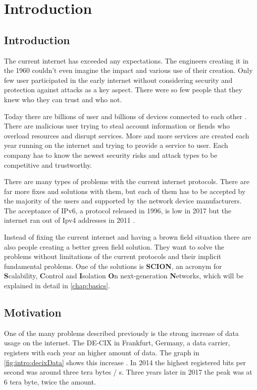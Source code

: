 \documentclass[thesis.tex]{subfiles}
\begin{document}
\chapter{Introduction}
\label{chap:introduction}


\section{Introduction}
The current internet  has exceeded any expectations. The engineers creating it in the 1960 couldn't even imagine the impact and various use of their creation. Only few user participated in the early internet without considering security and protection against attacks as a key aspect. There were so few people that they knew who they can trust and who not.

Today there are billions of user and billions of devices connected to each other \cite{MiniwattsMarketingGroup.31.12.2017}. There are malicious user trying to steal account information or fiends who overload resources and disrupt services. More and more services are created each year running on the internet and trying to provide a service to user. Each company has to know the newest security risks and attack types to be competitive and trustworthy. 

There are many types of problems with the current internet protocols. There are far more fixes and solutions with them, but each of them has to be accepted by the majority of the users and supported by the network device manufacturers. The acceptance of IPv6, a protocol released in 1996, is low in 2017 but the internet ran out of Ipv4 addresses in 2011 \cite{ICANN.03.02.2011}.

Instead of fixing the current internet and having a brown field situation there are also people creating a better green field solution. They want to solve the problems without limitations of the current protocols and their implicit fundamental problems. One of the solutions is \textbf{SCION}, an acronym for \textbf{S}calability, \textbf{C}ontrol and \textbf{I}solation \textbf{O}n next-generation \textbf{N}etworks, which will be explained in detail in \autoref{chap:basics}.


\section{Motivation}
One of the many problems described previously is the strong increase of data usage on the internet. The DE-CIX in Frankfurt, Germany, a data carrier, registers with each year an higher amount of data. The graph in \autoref{fig:intro:decixData} shows this increase . In 2014 the highest registered bits per second was around three tera bytes / s. Three years later in 2017 the peak was at 6 tera byte, twice the amount. 
\end{document}

